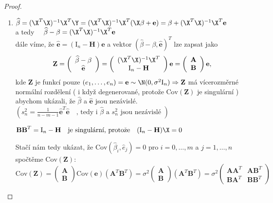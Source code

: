 \begin{proof}
\begin{enumerate}
  \item $ \widehat{\beta} = ( \X^{T} \X )^{-1} \X^{T} \Y = ( \X^{T} \X )^{-1} \X^{T} ( \X \beta + \textbf{e} ) = \beta + ( \X^{T} \X )^{-1} \X^{T} \textbf{e} 
$ \\
a tedy $ \quad \widehat{\beta} - \beta =  ( \X^{T} \X )^{-1} \X^{T} \textbf{e} $ \\
dále víme, že $ \widehat{\textbf{e}} = ( \text{I}_n - \textbf{H} ) \textbf{e} $ a vektor $ ( \widehat{\beta} - \beta , \widehat{\textbf{e}} )^{T} $ lze zapsat jako
$$
\textbf{Z} = \left( \begin{array}{c}
 \widehat{\beta} - \beta \\
 \widehat{\textbf{e}}  
\end{array}
 \right) 
 =
 \left( \begin{array}{c}
 ( \X^{T} \X )^{-1} \X^{T} \\
 \text{I}_n - \textbf{H}  
 \end{array}
 \right) \textbf{e}
 =
 \left( \begin{array}{c}
 \textbf{A}  \\
 \textbf{B}  
 \end{array}
 \right) \textbf{e} ,
$$
kde \textbf{Z} je funkcí pouze $ ( e_1 ,\dots , e_n ) = \textbf{e} \sim \N ( 0 , \sigma^{2} \text{I}_n ) \Rightarrow \textbf{Z} $ má vícerozměrné normální rozdělení ( i když degenerované, protože $ \text{Cov}( \textbf{Z} ) $ je singulární ) abychom ukázali, že $ \widehat{\beta} $ a $ \widehat{\textbf{e}} $ jsou  nezávislé. \\
$ ( s_n^{2} = \frac{1}{n - m - 1} \widehat{\textbf{e}}^{T} \widehat{\textbf{e}} \quad \text{, tedy i } \widehat{\beta} \text{ a } s_n^{2} \text{ jsou nezávislé })  $
\begin{remark}
  $ \textbf{B} \textbf{B}^{T} = \text{I}_n - \textbf{H} \quad \text{je singulární, protože} \quad ( \text{I}_n - \textbf{H} ) \X = 0 $
\end{remark}
Stačí nám tedy ukázat, že $ \text{Cov}( \widehat{\beta}_i , \widehat{e}_j ) = 0 $ pro $ i = 0, \dots , m $ a $ j = 1, \dots , n $ \\
spočtěme $ \text{Cov}( \textbf{Z} ) $: \\
$$
  \text{Cov}( \textbf{Z} ) 
 = 
  \left( \begin{array}{c}
 \textbf{A}  \\
 \textbf{B}  
 \end{array}
 \right) \text{Cov}( \textbf{e} ) \left(  \textbf{A}^{T} \textbf{B}^{T}  \right)
 = 
 \sigma^{2}
 \left( \begin{array}{c}
 \textbf{A}  \\
 \textbf{B}  
 \end{array} \right)
 \left(  \textbf{A}^{T} \textbf{B}^{T}  \right)
 = 
 \sigma^{2}
 \left( \begin{array}{cc}
 \textbf{AA}^{T} & \textbf{AB}^{T} \\
 \textbf{BA}^{T} & \textbf{BB}^{T}
 \end{array} \right)
$$


\end{enumerate}
\end{proof}
